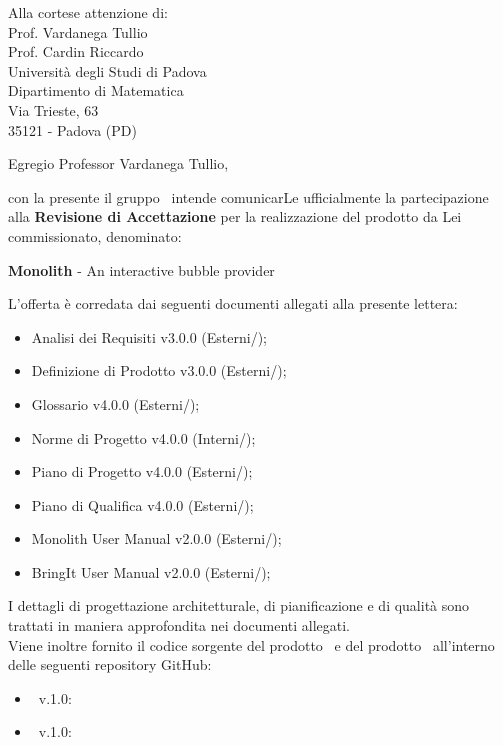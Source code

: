 

\newcommand{\logo}{../../Template/Logo/Logo.png}
\newcommand{\data}{\today}
\newcommand{\oggetto}{Partecipazione alla Revisione di Accettazione.}
\newcommand{\mittente}{Manuel Turetta \\ Responsabile NPE Developers}
\newcommand{\firma}{../../Template/Firme/MT.png}





\begin{letter}{Alla cortese attenzione di:  \\
 Prof. Vardanega Tullio \\
 Prof. Cardin Riccardo \\
 Università degli Studi di Padova \\
 Dipartimento di Matematica \\
 Via Trieste, 63 \\
 35121 - Padova (PD)}

\opening{Egregio Professor Vardanega Tullio,} 

con la presente il gruppo \gruppo\ intende comunicarLe ufficialmente la partecipazione alla \textbf{Revisione di Accettazione} per la realizzazione del prodotto da Lei commissionato, denominato:
\begin{center}
\textbf{Monolith} - An interactive bubble provider
\end{center}
L'offerta è corredata dai seguenti documenti allegati alla presente lettera:
\begin{itemize}
	\item Analisi dei Requisiti v3.0.0 (Esterni/\analisiDeiRequisiti);
	\item Definizione di Prodotto v3.0.0 (Esterni/);
	\item Glossario v4.0.0 (Esterni/\glossario);
	\item Norme di Progetto v4.0.0 (Interni/\normeDiProgetto);
	\item Piano di Progetto v4.0.0 (Esterni/\pianoDiProgetto);
	\item Piano di Qualifica v4.0.0 (Esterni/\pianoDiQualifica);
	\item Monolith User Manual v2.0.0 (Esterni/\manualeUtente);
	\item BringIt User Manual v2.0.0 (Esterni/\manualeUtenteApp);
\end{itemize}

I dettagli di progettazione architetturale, di pianificazione e di qualità sono trattati in maniera approfondita nei documenti allegati. \\
Viene inoltre fornito il codice sorgente del prodotto \progettoShort\ e del prodotto \app\, all'interno delle seguenti repository GitHub:
\begin{itemize}
	\item \progettoShort\ v.1.0: 
	\item \app\ v.1.0: 
\end{itemize}



\end{letter}
